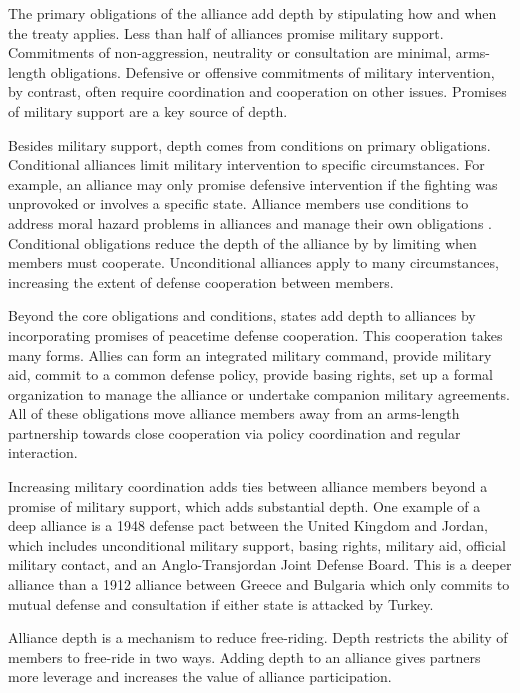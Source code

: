 \documentclass[12pt]{article}
\begin{document}
The primary obligations of the alliance add depth by stipulating how and when the treaty applies. 
Less than half of alliances promise military support. 
Commitments of non-aggression, neutrality or consultation are minimal, arms-length obligations. 
Defensive or offensive commitments of military intervention, by contrast, often require coordination and cooperation on other issues. 
Promises of military support are a key source of depth. 


Besides military support, depth comes from conditions on primary obligations. 
Conditional alliances limit military intervention to specific circumstances. 
For example, an alliance may only promise defensive intervention if the fighting was unprovoked or involves a specific state.  
Alliance members use conditions to address moral hazard problems in alliances \citep{Benson2012, Bensonetal2014} and manage their own obligations \citep{Chibaetal2015}. 
Conditional obligations reduce the depth of the alliance by by limiting when members must cooperate. 
Unconditional alliances apply to many circumstances, increasing the extent of defense cooperation between members.


Beyond the core obligations and conditions, states add depth to alliances by incorporating promises of peacetime defense cooperation. 
This cooperation takes many forms. 
Allies can form an integrated military command, provide military aid, commit to a common defense policy, provide basing rights, set up a formal organization to manage the alliance or undertake companion military agreements. 
All of these obligations move alliance members away from an arms-length partnership towards close cooperation via policy coordination and regular interaction. 


Increasing military coordination adds ties between alliance members beyond a promise of military support, which adds substantial depth. 
One example of a deep alliance is a 1948 defense pact between the United Kingdom and Jordan, which includes unconditional military support, basing rights, military aid, official military contact, and an Anglo-Transjordan Joint Defense Board.  
This is a deeper alliance than a 1912 alliance between Greece and Bulgaria which only commits to mutual defense and consultation if either state is attacked by Turkey. 


Alliance depth is a mechanism to reduce free-riding. 
Depth restricts the ability of members to free-ride in two ways. 
Adding depth to an alliance gives partners more leverage and increases the value of alliance participation. 
\end{document}
